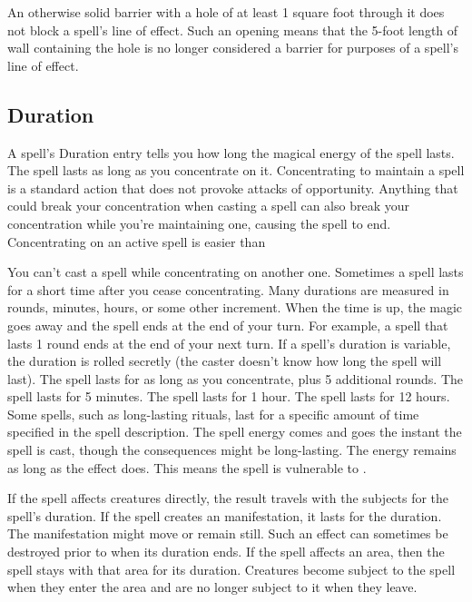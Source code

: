 An otherwise solid barrier with a hole of at least 1 square foot through it does not block a spell's line of effect. Such an opening means that the 5-foot length of wall containing the hole is no longer considered a barrier for purposes of a spell's line of effect.

\subsection{Duration}
A spell's Duration entry tells you how long the magical energy of the spell lasts.
 The spell lasts as long as you concentrate on it. Concentrating to maintain a spell is a standard action that does not provoke attacks of opportunity. Anything that could break your concentration when casting a spell can also break your concentration while you're maintaining one, causing the spell to end. Concentrating on an active spell is easier than

You can't cast a spell while concentrating on another one. Sometimes a spell lasts for a short time after you cease concentrating.
 Many durations are measured in rounds, minutes, hours, or some other increment. When the time is up, the magic goes away and the spell ends at the end of your turn. For example, a spell that lasts 1 round ends at the end of your next turn. If a spell's duration is variable, the duration is rolled secretly (the caster doesn't know how long the spell will last).
 The spell lasts for as long as you concentrate, plus 5 additional rounds.
 The spell lasts for 5 minutes.
 The spell lasts for 1 hour.
 The spell lasts for 12 hours.
 Some spells, such as long-lasting rituals, last for a specific amount of time specified in the spell description.
 The spell energy comes and goes the instant the spell is cast, though the consequences might be long-lasting.
 The energy remains as long as the effect does. This means the spell is vulnerable to .

 If the spell affects creatures directly, the result travels with the subjects for the spell's duration. If the spell creates an manifestation, it lasts for the duration. The manifestation might move or remain still. Such an effect can sometimes be destroyed prior to when its duration ends. If the spell affects an area, then the spell stays with that area for its duration. Creatures become subject to the spell when they enter the area and are no longer subject to it when they leave.


